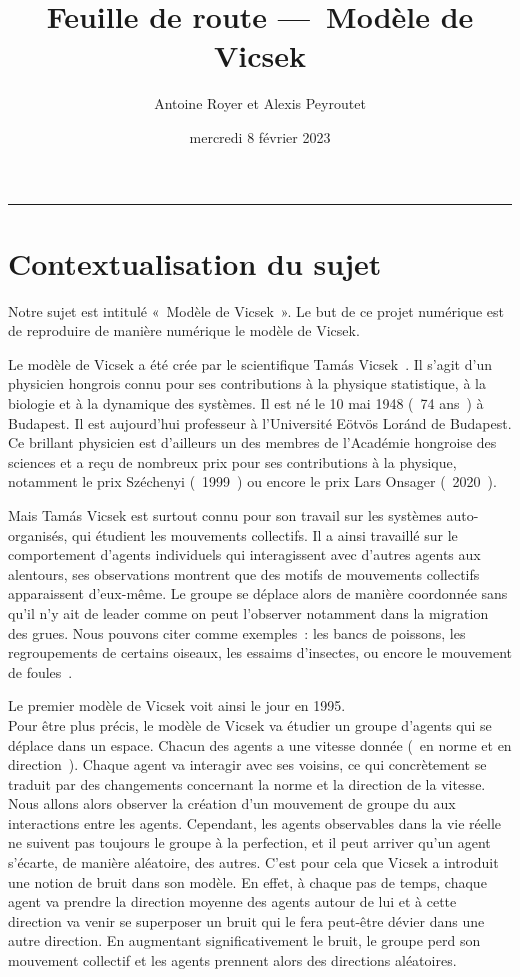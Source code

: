 \documentclass[french, a4paper, 12pt]{article}
\title{\sc Feuille de route —~Modèle de Vicsek}
\author{Antoine Royer et Alexis Peyroutet}
\date{mercredi 8 février 2023}
\begin{document}
 \maketitle \vspace{3pt} \hrule \vspace{3pt}

\section{Contextualisation du sujet}

	Notre sujet est intitulé «~Modèle de Vicsek~». Le but de ce projet numérique est de reproduire de manière numérique le modèle de Vicsek.

	Le modèle de Vicsek a été crée par le scientifique Tamás Vicsek~\cite{wiki-vicsek}. Il s'agit d'un physicien hongrois connu pour ses contributions à la physique statistique, à la biologie et à la dynamique des systèmes. Il est né le 10 mai 1948 (~74 ans~) à Budapest. Il est aujourd'hui professeur à l'Université Eötvös Loránd de Budapest. Ce brillant physicien est d'ailleurs un des membres de l'Académie hongroise des sciences et a reçu de nombreux prix pour ses contributions à la physique, notamment le prix Széchenyi (~1999~) ou encore le prix Lars Onsager (~2020~).

	Mais Tamás Vicsek est surtout connu pour son travail sur les systèmes auto-organisés, qui étudient les mouvements collectifs. Il a ainsi travaillé sur le comportement d'agents individuels qui interagissent avec d'autres agents aux alentours, ses observations montrent que des motifs de mouvements collectifs apparaissent d'eux-même. Le groupe se déplace alors de manière coordonnée sans qu'il n'y ait de leader comme on peut l'observer notamment dans la migration des grues. Nous pouvons citer comme exemples~: les bancs de poissons, les regroupements de certains oiseaux, les essaims d'insectes, ou encore le mouvement de foules~\cite{vicsek-paper, wiki-model}.

	 Le premier modèle de Vicsek voit ainsi le jour en 1995.\\

	Pour être plus précis, le modèle de Vicsek va étudier un groupe d'agents qui se déplace dans un espace. Chacun des agents a une vitesse donnée (~en norme et en direction~). Chaque agent va interagir avec ses voisins, ce qui concrètement se traduit par des changements concernant la norme et la direction de la vitesse. Nous allons alors observer la création d'un mouvement de groupe du aux interactions entre les agents. Cependant, les agents observables dans la vie réelle ne suivent pas toujours le groupe à la perfection, et il peut arriver qu'un agent s'écarte, de manière aléatoire, des autres. C'est pour cela que Vicsek a introduit une notion de bruit dans son modèle. En effet, à chaque pas de temps, chaque agent va prendre la direction moyenne des agents autour de lui et à cette direction va venir se superposer un bruit qui le fera peut-être dévier dans une autre direction. En augmentant significativement le bruit, le groupe perd son mouvement collectif et les agents prennent alors des directions aléatoires.\\
\end{document}
